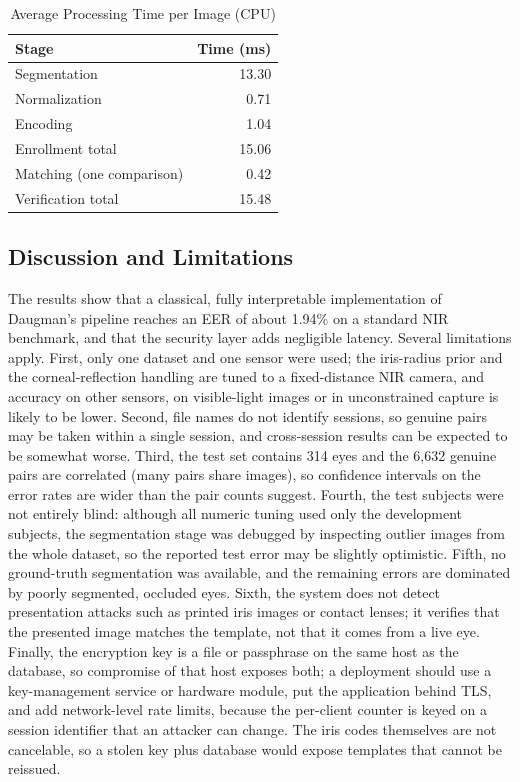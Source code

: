 \documentclass[conference]{IEEEtran}
\begin{document}
\begin{table}[!t]
\caption{Average Processing Time per Image (CPU)}
\label{tab:time}
\centering\small
\begin{tabular}{lr}
\toprule
\textbf{Stage} & \textbf{Time (ms)} \\
\midrule
Segmentation & 13.30 \\
Normalization & 0.71 \\
Encoding & 1.04 \\
Enrollment total & 15.06 \\
Matching (one comparison) & 0.42 \\
Verification total & 15.48 \\
\bottomrule
\end{tabular}
\end{table}


\subsection{Discussion and Limitations}\label{sec:limits}
The results show that a classical, fully interpretable implementation of Daugman's pipeline reaches an EER of about 1.94\% on a standard NIR benchmark, and that the security layer adds negligible latency. Several limitations apply. First, only one dataset and one sensor were used; the iris-radius prior and the corneal-reflection handling are tuned to a fixed-distance NIR camera, and accuracy on other sensors, on visible-light images or in unconstrained capture is likely to be lower. Second, file names do not identify sessions, so genuine pairs may be taken within a single session, and cross-session results can be expected to be somewhat worse. Third, the test set contains 314 eyes and the 6{,}632 genuine pairs are correlated (many pairs share images), so confidence intervals on the error rates are wider than the pair counts suggest. Fourth, the test subjects were not entirely blind: although all numeric tuning used only the development subjects, the segmentation stage was debugged by inspecting outlier images from the whole dataset, so the reported test error may be slightly optimistic. Fifth, no ground-truth segmentation was available, and the remaining errors are dominated by poorly segmented, occluded eyes. Sixth, the system does not detect presentation attacks such as printed iris images or contact lenses; it verifies that the presented image matches the template, not that it comes from a live eye. Finally, the encryption key is a file or passphrase on the same host as the database, so compromise of that host exposes both; a deployment should use a key-management service or hardware module, put the application behind TLS, and add network-level rate limits, because the per-client counter is keyed on a session identifier that an attacker can change. The iris codes themselves are not cancelable, so a stolen key plus database would expose templates that cannot be reissued.
\end{document}
